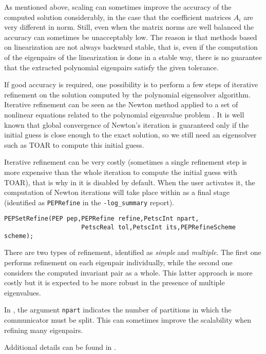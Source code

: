 As mentioned above, scaling can sometimes improve the accuracy of the computed solution considerably, in the case that the coefficient matrices $A_i$ are very different in norm. Still, even when the matrix norms are well balanced the accuracy can sometimes be unacceptably low. The reason is that methods based on linearization are not always backward stable, that is, even if the computation of the eigenpairs of the linearization is done in a stable way, there is no guarantee that the extracted polynomial eigenpairs satisfy the given tolerance.

If good accuracy is required, one possibility is to perform a few steps of iterative refinement on the solution computed by the polynomial eigensolver algorithm. Iterative refinement can be seen as the Newton method applied to a set of nonlinear equations related to the polynomial eigenvalue problem \citep{Betcke:2011:PER}. It is well known that global convergence of Newton's iteration is guaranteed only if the initial guess is close enough to the exact solution, so we still need an eigensolver such as TOAR to compute this initial guess.

Iterative refinement can be very costly (sometimes a single refinement step is more expensive than the whole iteration to compute the initial guess with TOAR), that is why in \slepc it is disabled by default. When the user activates it, the computation of Newton iterations will take place within  as a final stage (identified as \texttt{PEPRefine} in the \Verb!-log_summary! report).

	\begin{Verbatim}[fontsize=\small]
	PEPSetRefine(PEP pep,PEPRefine refine,PetscInt npart,
                     PetscReal tol,PetscInt its,PEPRefineScheme scheme);
	\end{Verbatim}

There are two types of refinement, identified as \emph{simple} and \emph{multiple}. The first one performs refinement on each eigenpair individually, while the second one considers the computed invariant pair as a whole. This latter approach is more costly but it is expected to be more robust in the presence of multiple eigenvalues.

In , the argument \texttt{npart} indicates the number of partitions in which the communicator must be split. This can sometimes improve the scalability when refining many eigenpairs.

Additional details can be found in \citep{Campos:2016:PIR}.

